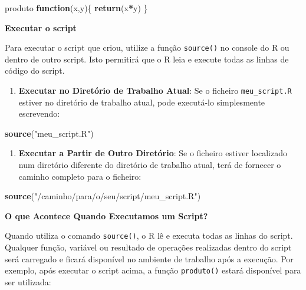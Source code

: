 \documentclass[
]{book}
\newenvironment{Shaded}{\begin{snugshade}}{\end{snugshade}}
\newcommand{\ControlFlowTok}[1]{\textcolor[rgb]{0.13,0.29,0.53}{\textbf{#1}}}
\newcommand{\FunctionTok}[1]{\textcolor[rgb]{0.13,0.29,0.53}{\textbf{#1}}}
\newcommand{\NormalTok}[1]{#1}
\newcommand{\SpecialCharTok}[1]{\textcolor[rgb]{0.81,0.36,0.00}{\textbf{#1}}}
\newcommand{\StringTok}[1]{\textcolor[rgb]{0.31,0.60,0.02}{#1}}
\providecommand{\tightlist}{%
  \setlength{\itemsep}{0pt}\setlength{\parskip}{0pt}}
\begin{document}
\begin{Shaded}
\begin{Highlighting}[]
\NormalTok{produto }\ControlFlowTok{function}\NormalTok{(x,y)\{}
  \FunctionTok{return}\NormalTok{(x}\SpecialCharTok{*}\NormalTok{y)}
\NormalTok{\}}
\end{Highlighting}
\end{Shaded}

\textbf{Executar o script}

Para executar o script que criou, utilize a função \texttt{source()} no console
do R ou dentro de outro script. Isto permitirá que o R leia e execute
todas as linhas de código do script.

\begin{enumerate}
\def\labelenumi{\arabic{enumi}.}
\tightlist
\item
  \textbf{Executar no Diretório de Trabalho Atual}: Se o ficheiro
  \texttt{meu\_script.R} estiver no diretório de trabalho atual, pode
  executá-lo simplesmente escrevendo:
\end{enumerate}

\begin{Shaded}
\begin{Highlighting}[]
\FunctionTok{source}\NormalTok{(}\StringTok{"meu\_script.R"}\NormalTok{)}
\end{Highlighting}
\end{Shaded}

\begin{enumerate}
\def\labelenumi{\arabic{enumi}.}
\setcounter{enumi}{1}
\tightlist
\item
  \textbf{Executar a Partir de Outro Diretório}: Se o ficheiro estiver
  localizado num diretório diferente do diretório de trabalho atual,
  terá de fornecer o caminho completo para o ficheiro:
\end{enumerate}

\begin{Shaded}
\begin{Highlighting}[]
\FunctionTok{source}\NormalTok{(}\StringTok{"/caminho/para/o/seu/script/meu\_script.R"}\NormalTok{)}
\end{Highlighting}
\end{Shaded}

\textbf{O que Acontece Quando Executamos um Script?}

Quando utiliza o comando \texttt{source()}, o R lê e executa todas as linhas do
script. Qualquer função, variável ou resultado de operações realizadas
dentro do script será carregado e ficará disponível no ambiente de
trabalho após a execução. Por exemplo, após executar o script acima, a
função \texttt{produto()} estará disponível para ser utilizada:
\end{document}
